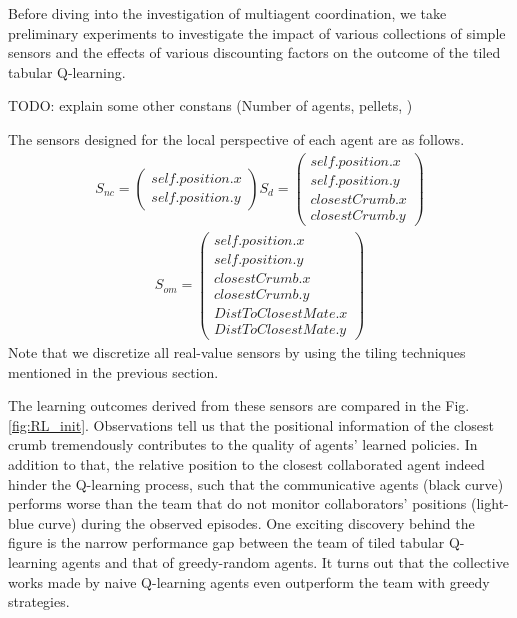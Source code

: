 \documentclass[conference]{IEEEtran}
\begin{document}
Before diving into the investigation of multiagent coordination, we take 
preliminary experiments to investigate the impact of various collections of
simple sensors and the effects of various discounting factors on the outcome
of the tiled tabular Q-learning.

TODO: explain some other constans (Number of agents, pellets, )


The sensors designed for the local perspective of each agent are as follows. 
\begin{align}
    S_{nc} = \left( \begin{array}{c}
      self.position.x \\
      self.position.y 
  \end{array} \right)
    S_{d} = \left( \begin{array}{c}
      self.position.x \\
      self.position.y \\
      closestCrumb.x \\
      closestCrumb.y 
  \end{array} \right)
    \nonumber
\end{align}
\begin{align}
        S_{om} = \left( \begin{array}{c}
      self.position.x \\
      self.position.y \\
      closestCrumb.x \\
      closestCrumb.y  \\
      DistToClosestMate.x \\
      DistToClosestMate.y 
  \end{array} \right)
        \nonumber
\end{align}
Note that we discretize all real-value sensors by using the tiling
techniques mentioned in the previous section. 

The learning outcomes derived from these sensors are compared in the
Fig. \ref{fig:RL_init}. 
Observations tell us that the positional information of the closest crumb
tremendously contributes to the quality of agents' learned policies. 
In addition to that, the relative position to the closest collaborated agent
indeed hinder the Q-learning process, such that the communicative agents (black
curve) performs worse than the team that do not monitor collaborators'
positions (light-blue curve) during the observed episodes. One exciting
discovery behind the figure is the narrow performance gap between the team of
tiled tabular Q-learning agents and that of greedy-random agents. It turns out
that the collective works made by naive Q-learning agents even outperform the
team with greedy strategies.
\end{document}
